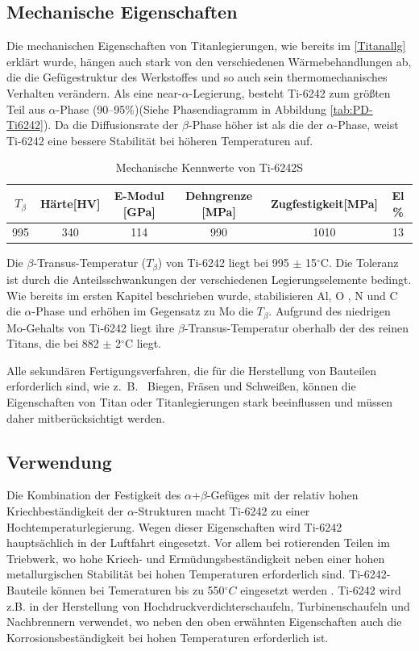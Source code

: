 \subsection{Mechanische Eigenschaften}

Die mechanischen Eigenschaften von Titanlegierungen, wie bereits im \ref{Titanallg} erklärt wurde, hängen auch stark von den verschiedenen Wärmebehandlungen ab, die die Gefügestruktur des Werkstoffes und so auch sein thermomechanisches Verhalten verändern.
Als eine near-$\alpha$-Legierung, besteht Ti-6242 zum größten Teil aus $\alpha$-Phase (90--95\%)(Siehe Phasendiagramm in Abbildung \ref{tab:PD-Ti6242}). Da die Diffusionsrate der $\beta$-Phase höher ist als die der $\alpha$-Phase, weist Ti-6242 eine bessere Stabilität bei höheren Temperaturen auf. \cite{Prasad.2017} 

\begin{table}
	\centering	
	\begin{tabular}{|c| c| c| c| c| c|}										
		\hline
		$T_{\beta}$ & Härte[HV] & E-Modul [GPa]& Dehngrenze [MPa]&Zugfestigkeit[MPa]& El \% \\
		\hline
		995&340&114&990&1010&13\\
		\hline
	\end{tabular}
	\caption{Mechanische Kennwerte von Ti-6242S \cite{C.Leyens.2005}}
	\label{Mec.}
\end{table}

Die $\beta$-Transus-Temperatur ($T_{\beta}$) von Ti-6242 liegt bei 995 $\pm$ 15$^\circ$C. Die Toleranz ist durch die Anteilsschwankungen der verschiedenen Legierungselemente bedingt. Wie bereits im ersten Kapitel beschrieben wurde, stabilisieren  Al, O , N und C die $\alpha$-Phase und erhöhen im Gegensatz zu Mo die $T_{\beta}$.
Aufgrund des niedrigen Mo-Gehalts von Ti-6242 liegt ihre $\beta$-Transus-Temperatur oberhalb der des reinen Titans, die bei 882 $\pm$ 2$^\circ$C liegt.

Alle sekundären Fertigungsverfahren, die für die Herstellung von Bauteilen erforderlich sind, wie z.~B.~ Biegen, Fräsen und Schweißen, können die  Eigenschaften von Titan oder Titanlegierungen stark beeinflussen und müssen daher mitberücksichtigt werden.


\subsection{Verwendung}


Die Kombination der Festigkeit des $\alpha$+$\beta$-Gefüges mit der relativ hohen Kriechbeständigkeit der $\alpha$-Strukturen macht Ti-6242 zu einer Hochtemperaturlegierung. 
Wegen dieser Eigenschaften wird Ti-6242 hauptsächlich in der Luftfahrt eingesetzt. Vor allem bei rotierenden Teilen im Triebwerk, wo hohe Kriech- und Ermüdungsbeständigkeit neben einer hohen metallurgischen Stabilität bei hohen Temperaturen erforderlich sind. 
Ti-6242-Bauteile können bei Temeraturen bis zu 550$^\circ C$ eingesetzt werden \cite{C.Leyens.2005}.
Ti-6242 wird z.B. in der Herstellung von Hochdruckverdichterschaufeln, Turbinenschaufeln und Nachbrennern verwendet, wo neben den oben erwähnten Eigenschaften auch die Korrosionsbeständigkeit bei hohen Temperaturen erforderlich ist. 


